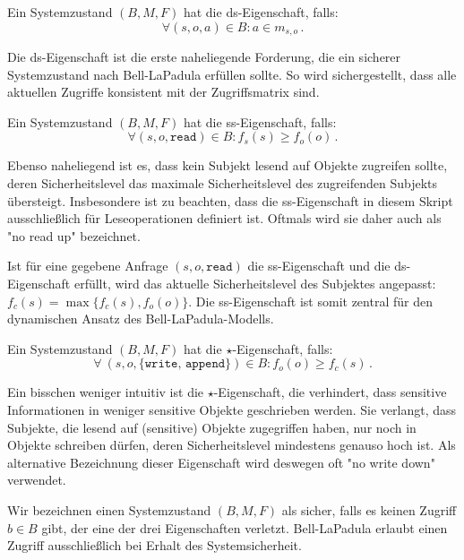 \begin{definition}\indexBLPDiscretionarySecurity
  Ein Systemzustand \((B, M, F)\) hat die ds-Eigenschaft, falls:
  \[
    \forall (s, o, a) \in B : a \in m_{s,o}\, .
  \]
\end{definition}

Die ds-Eigenschaft ist die erste naheliegende Forderung, die ein
sicherer Systemzustand nach Bell-LaPadula erfüllen sollte. So wird
sichergestellt, dass alle aktuellen Zugriffe konsistent mit der
Zugriffsmatrix sind.

\begin{definition}\indexBLPSimpleSecurity
  Ein Systemzustand \((B, M, F)\) hat die ss-Eigenschaft, falls:
  \[
    \forall (s, o, \texttt{read}) \in B : f_s(s) \geq f_o(o)\, .
  \]
\end{definition}

Ebenso naheliegend ist es, dass kein Subjekt lesend auf Objekte
zugreifen sollte, deren Sicherheitslevel das maximale Sicherheitslevel
des zugreifenden Subjekts übersteigt. Insbesondere ist zu beachten, dass
die ss-Eigenschaft in diesem Skript ausschließlich für Leseoperationen
definiert ist. Oftmals wird sie daher auch als "{}no read up"{}
bezeichnet.

Ist für eine gegebene Anfrage \((s, o, \texttt{read})\) die
ss-Eigenschaft und die ds-Eigenschaft erfüllt, wird das aktuelle
Sicherheitslevel des Subjektes angepasst: \(f_c(s) = \max \{f_c(s),
f_o(o)\}\). Die ss-Eigenschaft ist somit zentral für den dynamischen
Ansatz des Bell-LaPadula-Modells.

\begin{definition}\indexBLPStarProperty
  Ein Systemzustand \((B, M, F)\) hat die \(\star\)-Eigenschaft, falls: 
  \[
    \forall\ (s, o, \texttt{\{write, append\}}) \in B : f_o(o) \geq f_c(s)\, .
  \]
\end{definition}

Ein bisschen weniger intuitiv ist die \(\star\)-Eigenschaft, die
verhindert, dass sensitive Informationen in weniger sensitive Objekte
geschrieben werden. Sie verlangt, dass Subjekte, die lesend auf
(sensitive) Objekte zugegriffen haben, nur noch in Objekte schreiben
dürfen, deren Sicherheitslevel mindestens genauso hoch ist. Als
alternative Bezeichnung dieser Eigenschaft wird deswegen oft "{}no write
down"{} verwendet.

Wir bezeichnen einen Systemzustand \((B, M, F)\)\indexBLPSystemStatus
als sicher, falls es keinen Zugriff \(b \in B\) gibt, der eine der drei
Eigenschaften verletzt. Bell-LaPadula erlaubt einen Zugriff
ausschließlich bei Erhalt des Systemsicherheit.


